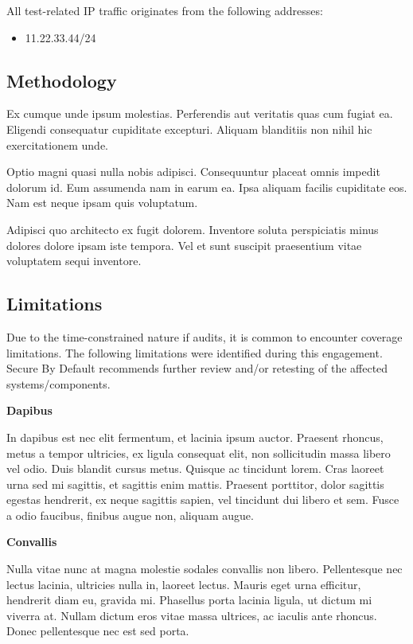 \documentclass[a4paper]{article}
\begin{document}
All test-related IP traffic originates from the following addresses:

\begin{itemize}
  \item 11.22.33.44/24
\end{itemize}

\subsection{Methodology}

Ex cumque unde ipsum molestias.
Perferendis aut veritatis quas cum fugiat ea.
Eligendi consequatur cupiditate excepturi.
Aliquam blanditiis non nihil hic exercitationem unde.

Optio magni quasi nulla nobis adipisci.
Consequuntur placeat omnis impedit dolorum id.
Eum assumenda nam in earum ea.
Ipsa aliquam facilis cupiditate eos.
Nam est neque ipsam quis voluptatum.

Adipisci quo architecto ex fugit dolorem.
Inventore soluta perspiciatis minus dolores dolore ipsam iste tempora.
Vel et sunt suscipit praesentium vitae voluptatem sequi inventore.



  \subsection{Limitations}

  Due to the time-constrained nature if audits, it is common to encounter coverage limitations.
  The following limitations were identified during this engagement.
  Secure By Default recommends further review and/or retesting of the affected systems/components.

  \textbf{Dapibus}

In dapibus est nec elit fermentum, et lacinia ipsum auctor.
Praesent rhoncus, metus a tempor ultricies, ex ligula consequat elit, non sollicitudin massa libero vel odio.
Duis blandit cursus metus.
Quisque ac tincidunt lorem.
Cras laoreet urna sed mi sagittis, et sagittis enim mattis.
Praesent porttitor, dolor sagittis egestas hendrerit, ex neque sagittis sapien, vel tincidunt dui libero et sem.
Fusce a odio faucibus, finibus augue non, aliquam augue.

\textbf{Convallis}

Nulla vitae nunc at magna molestie sodales convallis non libero.
Pellentesque nec lectus lacinia, ultricies nulla in, laoreet lectus.
Mauris eget urna efficitur, hendrerit diam eu, gravida mi.
Phasellus porta lacinia ligula, ut dictum mi viverra at.
Nullam dictum eros vitae massa ultrices, ac iaculis ante rhoncus.
Donec pellentesque nec est sed porta.
\end{document}
